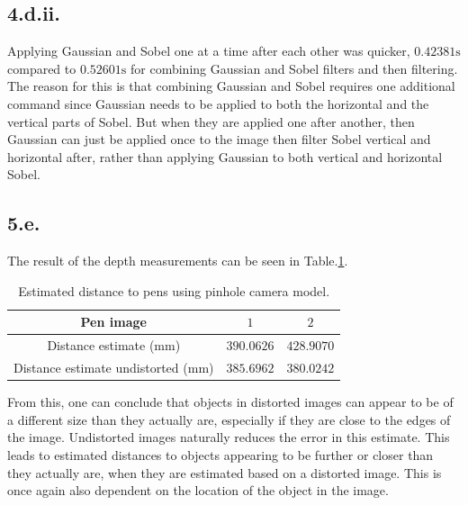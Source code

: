 \subsection{4.d.ii.}
Applying Gaussian and Sobel one at a time after each other was quicker, $0.42381\text{s}$ compared to $0.52601\text{s}$ for combining Gaussian and Sobel filters and then filtering. The reason for this is that combining Gaussian and Sobel requires one additional command since Gaussian needs to be applied to both the horizontal and the vertical parts of Sobel. But when they are applied one after another, then Gaussian can just be applied once to the image then filter Sobel vertical and horizontal after, rather than applying Gaussian to both vertical and horizontal Sobel.


\subsection{5.e.}
The result of the depth measurements can be seen in Table.\:\ref{tab:distance}.
\begin{table}
    \centering
    \begin{tabular}{c|c|c}
         Pen image                              & $1$           & $2$           \\ \hline
         Distance estimate (mm)                 & $390.0626$    & $428.9070$    \\
         Distance estimate undistorted (mm)     & $385.6962$    & $380.0242$
    \end{tabular}
    \caption{Estimated distance to pens using pinhole camera model.}
    \label{tab:distance}
\end{table}

From this, one can conclude that objects in distorted images can appear to be of a different size than they actually are, especially if they are close to the edges of the image. Undistorted images naturally reduces the error in this estimate. This leads to estimated distances to objects appearing to be further or closer than they actually are, when they are estimated based on a distorted image. This is once again also dependent on the location of the object in the image.

